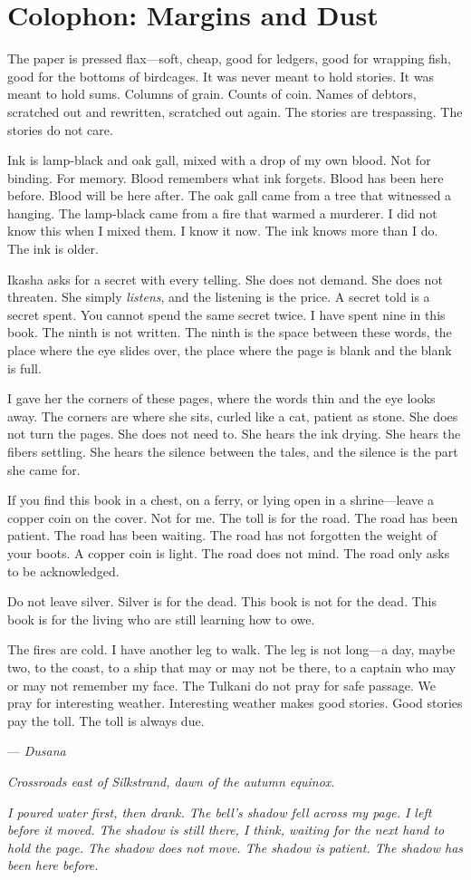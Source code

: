 \chapter*{Colophon: Margins and Dust}

The paper is pressed flax---soft, cheap, good for ledgers, good for wrapping fish, good for the bottoms of birdcages. It was never meant to hold stories. It was meant to hold sums. Columns of grain. Counts of coin. Names of debtors, scratched out and rewritten, scratched out again. The stories are trespassing. The stories do not care.

Ink is lamp-black and oak gall, mixed with a drop of my own blood. Not for binding. For memory. Blood remembers what ink forgets. Blood has been here before. Blood will be here after. The oak gall came from a tree that witnessed a hanging. The lamp-black came from a fire that warmed a murderer. I did not know this when I mixed them. I know it now. The ink knows more than I do. The ink is older.

\smallskip
Ikasha asks for a secret with every telling. She does not demand. She does not threaten. She simply \textit{listens}, and the listening is the price. A secret told is a secret spent. You cannot spend the same secret twice. I have spent nine in this book. The ninth is not written. The ninth is the space between these words, the place where the eye slides over, the place where the page is blank and the blank is full.

I gave her the corners of these pages, where the words thin and the eye looks away. The corners are where she sits, curled like a cat, patient as stone. She does not turn the pages. She does not need to. She hears the ink drying. She hears the fibers settling. She hears the silence between the tales, and the silence is the part she came for.

\smallskip
If you find this book in a chest, on a ferry, or lying open in a shrine---leave a copper coin on the cover. Not for me. The toll is for the road. The road has been patient. The road has been waiting. The road has not forgotten the weight of your boots. A copper coin is light. The road does not mind. The road only asks to be acknowledged.

Do not leave silver. Silver is for the dead. This book is not for the dead. This book is for the living who are still learning how to owe.

\smallskip
The fires are cold. I have another leg to walk. The leg is not long---a day, maybe two, to the coast, to a ship that may or may not be there, to a captain who may or may not remember my face. The Tulkani do not pray for safe passage. We pray for interesting weather. Interesting weather makes good stories. Good stories pay the toll. The toll is always due.

\smallskip
\noindent --- \textit{Dusana}  

\noindent \textit{Crossroads east of Silkstrand, dawn of the autumn equinox.}  

\noindent \textit{I poured water first, then drank. The bell's shadow fell across my page. I left before it moved. The shadow is still there, I think, waiting for the next hand to hold the page. The shadow does not move. The shadow is patient. The shadow has been here before.}